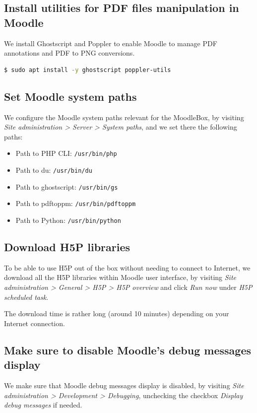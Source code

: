\documentclass[12pt]{article}
\begin{document}
\subsection{Install utilities for PDF files manipulation in Moodle}

We install Ghostscript and Poppler to enable Moodle to manage PDF annotations and PDF to PNG conversions.
\begin{lstlisting}[language=bash]
$ sudo apt install -y ghostscript poppler-utils
\end{lstlisting}

\subsection{Set Moodle system paths}

We configure the Moodle system paths relevant for the MoodleBox, by visiting \emph{Site administration > Server > System paths}, and we set there the following paths:
\begin{itemize}
\item Path to PHP CLI: \texttt{/usr/bin/php}
\item Path to du: \texttt{/usr/bin/du}
\item Path to ghostscript: \texttt{/usr/bin/gs}
\item Path to pdftoppm: \texttt{/usr/bin/pdftoppm}
\item Path to Python: \texttt{/usr/bin/python}
\end{itemize}

\subsection{Download H5P libraries}

To be able to use H5P out of the box without needing to connect to Internet, we download all the H5P libraries within Moodle user interface, by visiting \emph{Site administration > General > H5P > H5P overview} and click \emph{Run now} under \emph{H5P scheduled task}.

The download time is rather long (around 10 minutes) depending on your Internet connection.

\subsection{Make sure to disable Moodle's debug messages display}

We make sure that Moodle debug messages display is disabled, by visiting \emph{Site administration > Development > Debugging}, unchecking the checkbox \emph{Display debug messages} if needed.
\end{document}
